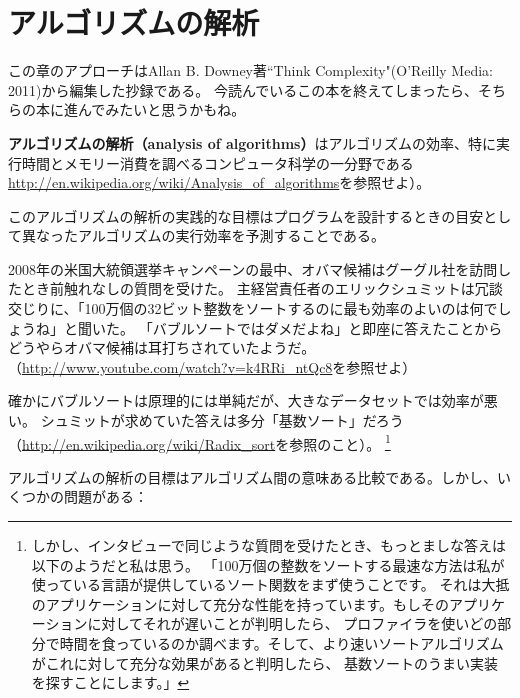 \documentclass[a4j,12pt,makeidx]{jbook}
\begin{document}
\chapter{アルゴリズムの解析}
この章のアプローチはAllan B. Downey著``Think Complexity"(O'Reilly Media: 2011)から編集した抄録である。
今読んでいるこの本を終えてしまったら、そちらの本に進んでみたいと思うかもね。\par
{\bf アルゴリズムの解析（analysis of algorithms）}はアルゴリズムの効率、特に実行時間とメモリー消費を調べるコンピュータ科学の一分野である 
\url{http://en.wikipedia.org/wiki/Analysis_of_algorithms}を参照せよ）。\par
このアルゴリズムの解析の実践的な目標はプログラムを設計するときの目安として異なったアルゴリズムの実行効率を予測することである。\par
2008年の米国大統領選挙キャンペーンの最中、オバマ候補はグーグル社を訪問したとき前触れなしの質問を受けた。
主経営責任者のエリックシュミットは冗談交じりに、「100万個の32ビット整数をソートするのに最も効率のよいのは何でしょうね」と聞いた。
「バブルソートではダメだよね」と即座に答えたことからどうやらオバマ候補は耳打ちされていたようだ。
（\url{http://www.youtube.com/watch?v=k4RRi_ntQc8}を参照せよ）\par
確かにバブルソートは原理的には単純だが、大きなデータセットでは効率が悪い。
シュミットが求めていた答えは多分「基数ソート」だろう 
（\url{http://en.wikipedia.org/wiki/Radix_sort}を参照のこと）。
\footnote{しかし、インタビューで同じような質問を受けたとき、もっとましな答えは以下のようだと私は思う。
「100万個の整数をソートする最速な方法は私が使っている言語が提供しているソート関数をまず使うことです。
それは大抵のアプリケーションに対して充分な性能を持っています。もしそのアプリケーションに対してそれが遅いことが判明したら、
プロファイラを使いどの部分で時間を食っているのか調べます。そして、より速いソートアルゴリズムがこれに対して充分な効果があると判明したら、
基数ソートのうまい実装を探すことにします。」}　\par
アルゴリズムの解析の目標はアルゴリズム間の意味ある比較である。しかし、いくつかの問題がある：
\end{document}
